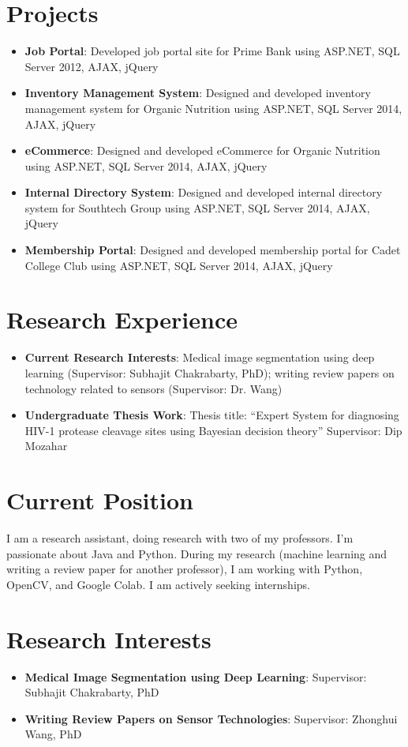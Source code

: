 \documentclass[letterpaper,11pt]{article}
\newcommand{\resumeItem}[2]{
  \item\small{
    \textbf{#1}{: #2 \vspace{-2pt}}
  }
}
\newcommand{\resumeSubItem}[2]{\resumeItem{#1}{#2}\vspace{-4pt}}
\newcommand{\resumeSubHeadingListStart}{\begin{itemize}[leftmargin=*]}
\newcommand{\resumeSubHeadingListEnd}{\end{itemize}}
\begin{document}
\section{Projects}
  \resumeSubHeadingListStart
    \resumeSubItem{Job Portal}
      {Developed job portal site for Prime Bank using ASP.NET, SQL Server 2012, AJAX, jQuery}
    \resumeSubItem{Inventory Management System}
      {Designed and developed inventory management system for Organic Nutrition using ASP.NET, SQL Server 2014, AJAX, jQuery}
    \resumeSubItem{eCommerce}
      {Designed and developed eCommerce for Organic Nutrition using ASP.NET, SQL Server 2014, AJAX, jQuery}
    \resumeSubItem{Internal Directory System}
      {Designed and developed internal directory system for Southtech Group using ASP.NET, SQL Server 2014, AJAX, jQuery}
    \resumeSubItem{Membership Portal}
      {Designed and developed membership portal for Cadet College Club using ASP.NET, SQL Server 2014, AJAX, jQuery}
  \resumeSubHeadingListEnd

\section{Research Experience}
\resumeSubHeadingListStart
    \resumeSubItem{Current Research Interests}
      {Medical image segmentation using deep learning (Supervisor: Subhajit Chakrabarty, PhD); writing review papers on technology related to sensors (Supervisor: Dr. Wang)}
    \resumeSubItem{Undergraduate Thesis Work}
      {Thesis title: “Expert System for diagnosing HIV-1 protease cleavage sites using Bayesian decision theory”}
      {Supervisor: Dip Mozahar}
    
\resumeSubHeadingListEnd


\section{Current Position}
\resumeSubHeadingListStart
  {I am a research assistant, doing research with two of my professors. I’m passionate about Java and Python. During my research (machine learning and writing a review paper for another professor), I am working with Python, OpenCV, and Google Colab. I am actively seeking internships.}
\resumeSubHeadingListEnd

\section{Research Interests}
\resumeSubHeadingListStart
    \resumeSubItem{Medical Image Segmentation using Deep Learning}
      {Supervisor: Subhajit Chakrabarty, PhD}
    \resumeSubItem{Writing Review Papers on Sensor Technologies}
      {Supervisor: Zhonghui Wang, PhD}
\resumeSubHeadingListEnd
\end{document}
